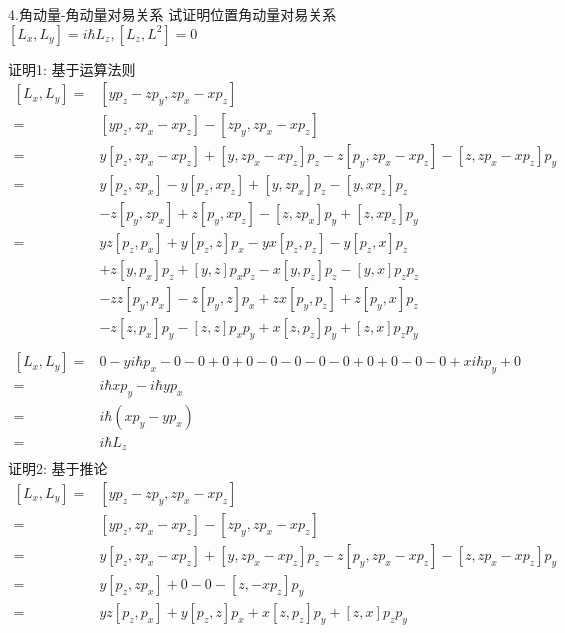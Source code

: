 \begin{frame} [allowframebreaks=]
    \frametitle{}
    \begin{tcolorbox1}{4.角动量-角动量对易关系}
        试证明位置角动量对易关系 $[L_x,L_y]=i\hbar L_z,  [L_z, L^2]= 0$
    \end{tcolorbox1}
    \alert{证明1:} 基于运算法则
    \begin{equation*}
        \begin{split}
        [L_x,L_y]= &[yp_z-zp_y,zp_x-xp_z]\\
        =&[yp_z,zp_x-xp_z] - [zp_y,zp_x-xp_z]\\
        =&y[p_z,zp_x-xp_z]+[y,zp_x-xp_z]p_z- z[p_y,zp_x-xp_z]-[z,zp_x-xp_z]p_y\\
        =&y[p_z,zp_x]-y[p_z,xp_z]+[y,zp_x]p_z-[y,xp_z]p_z \\ &-z[p_y,zp_x] +z[p_y,xp_z]- [z,zp_x]p_y+[z,xp_z]p_y\\
        =&yz[p_z,p_x]+y[p_z,z]p_x-yx[p_z,p_z]-y[p_z,x]p_z \\ & +z[y,p_x]p_z+[y,z]p_xp_z-x[y,p_z]p_z -[y,x]p_zp_z \\ & -zz[p_y,p_x] -z[p_y,z]p_x +zx[p_y,p_z] +z[p_y,x]p_z \\ & -z[z,p_x]p_y -[z,z]p_xp_y+x[z,p_z]p_y +[z,x]p_zp_y\\  
    \end{split}  
    \end{equation*}
    \begin{equation*}
        \begin{split}
        [L_x,L_y]=&0-yi\hbar p_x-0-0+0+0-0 -0-0 -0 +0 +0-0 -0+xi\hbar p_y +0\\
        =&i\hbar xp_y-i\hbar y p_x\\
        =&i\hbar (xp_y-y p_x)\\
        =&i\hbar L_z\\    
    \end{split}  
    \end{equation*}
    \alert{证明2:} 基于推论 
    \begin{equation*}
        \begin{split}
        [L_x,L_y]= &[yp_z-zp_y,zp_x-xp_z]\\
        =&[yp_z,zp_x-xp_z] - [zp_y,zp_x-xp_z]\\
        =&y[p_z,zp_x-xp_z]+[y,zp_x-xp_z]p_z- z[p_y,zp_x-xp_z]-[z,zp_x-xp_z]p_y\\
        =&y[p_z,zp_x]+0- 0-[z,-xp_z]p_y\\
        =&yz[p_z,p_x]+y[p_z,z]p_x+x[z,p_z]p_y+[z,x]p_zp_y\\

\end{split}
\end{equation*}
\end{frame}
